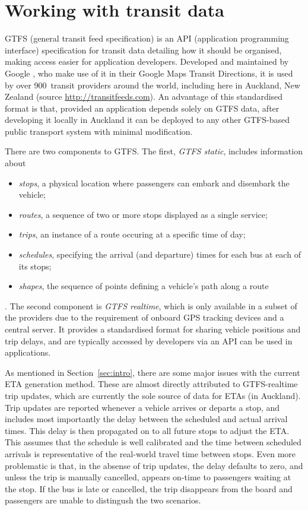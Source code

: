 \section{Working with \rt transit data}
\label{sec:gtfs}

GTFS (general transit feed specification)
is an API (application programming interface) specification for transit data
detailing how it should be organised,
making access easier for application developers.
Developed and maintained by Google \citep{GoogleDevelopers_2006},
who make use of it in their Google Maps Transit Directions,
it is used by over 900~transit providers around the world,
including here in Auckland, New Zealand
(source \url{http://transitfeeds.com}).
An advantage of this standardised format is that,
provided an application depends solely on GTFS data,
after developing it locally in Auckland it can be deployed to any other GTFS-based
public transport system with minimal modification.


There are two components to GTFS.
The first, \emph{GTFS static}, includes information about
\begin{itemize}
\item \emph{stops}, a physical location where passengers can embark and disembark the vehicle;
\item \emph{routes}, a sequence of two or more stops displayed as a single service;
\item \emph{trips}, an instance of a route occuring at a specific time of day;
\item \emph{schedules}, specifying the arrival (and departure) times for each bus at each of its stops; 
\item \emph{shapes}, the sequence of points defining a vehicle's path along a route
\end{itemize}
\citep{GoogleDevelopers_2006}.
The second component is \emph{GTFS realtime},
which is only available in a subset of the providers due to the requirement of 
onboard GPS tracking devices and a central server.
It provides a standardised format for sharing vehicle positions and trip delays,
and are typically accessed by developers via an API can be used in \rt applications.

As mentioned in Section~\ref{sec:intro},
there are some major issues with the current ETA generation method.
These are almost directly attributed to GTFS-realtime trip updates,
which are currently the sole source of data for ETAs (in Auckland).
Trip updates are reported whenever a vehicle arrives or departs a stop,
and includes most importantly the delay between the scheduled and actual arrival times.
This delay is then propagated on to all future stops to adjust the ETA.
This assumes that the schedule is well calibrated and the time between scheduled arrivals
is representative of the real-world travel time between stops. 
Even more problematic is that, in the absense of trip updates,
the delay defaults to zero,
and unless the trip is manually cancelled,
appears on-time to passengers waiting at the stop.
If the bus is late or cancelled,
the trip disappears from the \rt board and passengers
are unable to distingush the two scenarios.


